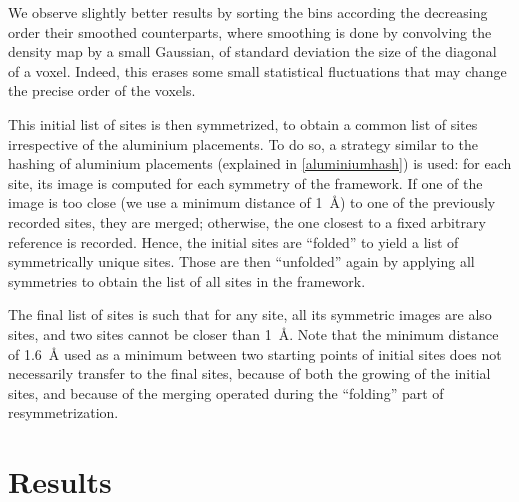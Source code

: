 \documentclass[main.tex]{subfiles}
\begin{document}
We observe slightly better results by sorting the bins according the decreasing order their smoothed counterparts, where smoothing is done by convolving the density map by a small Gaussian, of standard deviation the size of the diagonal of a voxel. Indeed, this erases some small statistical fluctuations that may change the precise order of the voxels.

This initial list of sites is then symmetrized, to obtain a common list of sites irrespective of the aluminium placements. To do so, a strategy similar to the hashing of aluminium placements (explained in \cref{aluminiumhash}) is used: for each site, its image is computed for each symmetry of the framework. If one of the image is too close (we use a minimum distance of \qty{1}{\angstrom}) to one of the previously recorded sites, they are merged; otherwise, the one closest to a fixed arbitrary reference is recorded. Hence, the initial sites are ``folded'' to yield a list of symmetrically unique sites. Those are then ``unfolded'' again by applying all symmetries to obtain the list of all sites in the framework.

The final list of sites is such that for any site, all its symmetric images are also sites, and two sites cannot be closer than \qty{1}{\angstrom}. Note that the minimum distance of \qty{1.6}{\angstrom} used as a minimum between two starting points of initial sites does not necessarily transfer to the final sites, because of both the growing of the initial sites, and because of the merging operated during the ``folding'' part of resymmetrization.

\section{Results}
\end{document}
